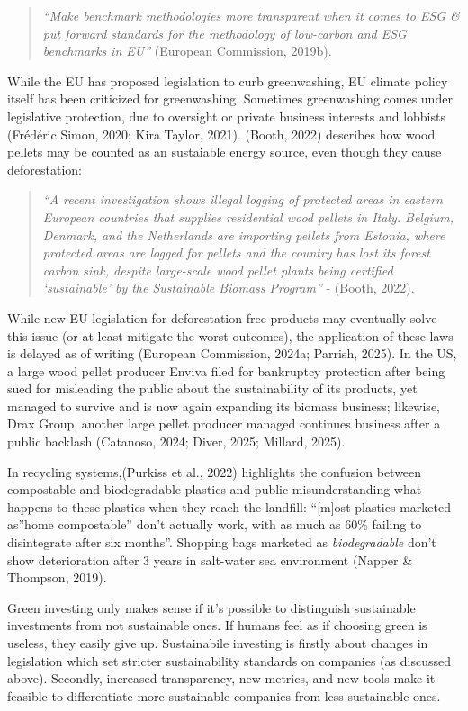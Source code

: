 \documentclass[
  12pt,
  letterpaper,
  DIV=11,
  numbers=noendperiod]{scrartcl}
\begin{document}
\begin{quote}
\emph{``Make benchmark methodologies more transparent when it comes to
ESG \& put forward standards for the methodology of low-carbon and ESG
benchmarks in EU''} (European Commission, 2019b).
\end{quote}

While the EU has proposed legislation to curb greenwashing, EU climate
policy itself has been criticized for greenwashing. Sometimes
greenwashing comes under legislative protection, due to oversight or
private business interests and lobbists (Frédéric Simon, 2020; Kira
Taylor, 2021). (Booth, 2022) describes how wood pellets may be counted
as an sustaiable energy source, even though they cause deforestation:

\begin{quote}
\emph{``A recent investigation shows illegal logging of protected areas
in eastern European countries that supplies residential wood pellets in
Italy. Belgium, Denmark, and the Netherlands are importing pellets from
Estonia, where protected areas are logged for pellets and the country
has lost its forest carbon sink, despite large-scale wood pellet plants
being certified `sustainable' by the Sustainable Biomass Program''} -
(Booth, 2022).
\end{quote}

While new EU legislation for deforestation-free products may eventually
solve this issue (or at least mitigate the worst outcomes), the
application of these laws is delayed as of writing (European Commission,
2024a; Parrish, 2025). In the US, a large wood pellet producer Enviva
filed for bankruptcy protection after being sued for misleading the
public about the sustainability of its products, yet managed to survive
and is now again expanding its biomass business; likewise, Drax Group,
another large pellet producer managed continues business after a public
backlash (Catanoso, 2024; Diver, 2025; Millard, 2025).

In recycling systems,(Purkiss et al., 2022) highlights the confusion
between compostable and biodegradable plastics and public
misunderstanding what happens to these plastics when they reach the
landfill: ``{[}m{]}ost plastics marketed as''home compostable'' don't
actually work, with as much as 60\% failing to disintegrate after six
months''. Shopping bags marketed as \emph{biodegradable} don't show
deterioration after 3 years in salt-water sea environment (Napper \&
Thompson, 2019).

Green investing only makes sense if it's possible to distinguish
sustainable investments from not sustainable ones. If humans feel as if
choosing green is useless, they easily give up. Sustainabile investing
is firstly about changes in legislation which set stricter
sustainability standards on companies (as discussed above). Secondly,
increased transparency, new metrics, and new tools make it feasible to
differentiate more sustainable companies from less sustainable ones.
\end{document}
